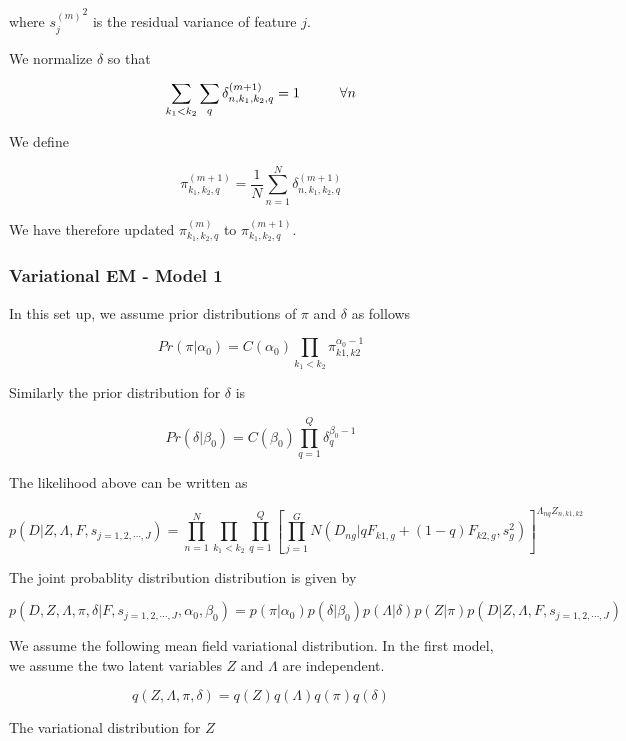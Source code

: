 \documentclass[12pt]{article}
\begin{document}
where ${s_j^{(m)}}^2$ is the residual variance of feature $j$.

We normalize $\delta$ so that 

$$ \sum_{k_1 < k_2} \sum_{q} \delta^{(m+1)}_{n, k_1, k_2, q} = 1 \hspace{1 cm} \forall n $$

We define 

$$ \pi^{(m+1)}_{k_1, k_2, q} = \frac{1}{N}\sum_{n=1}^{N} \delta^{(m+1)}_{n, k_1, k_2, q} $$


We have therefore updated $\pi^{(m)}_{k_1, k_2, q}$ to $\pi^{(m+1)}_{k_1, k_2, q}$.


\subsubsection{Variational EM  - Model 1}

In this set up, we assume prior distributions of $\pi$ and $\delta$ as follows

$$ Pr (\pi | \alpha_{0}) = C (\alpha_0) \prod_{k_1 < k_2} \pi_{k1, k2}^{\alpha_0 -1} $$

Similarly the prior distribution for $\delta$ is 

$$ Pr (\delta | \beta_0) = C (\beta_0) \prod_{q=1}^{Q} \delta_{q}^{\beta_0 -1 }  $$

The likelihood above can be written as 

$$ p (D | Z, \Lambda, F, s_{j=1,2,\cdots,J}) = \prod_{n=1}^{N} \prod_{k_1 < k_2} \prod_{q=1}^{Q} [ \prod_{j=1}^{G} N (D_{ng} | qF_{k1,g} + (1-q)F_{k2,g}, s^2_{g})]^{\Lambda_{nq}Z_{n,k1,k2}} $$

The joint probablity distribution distribution is given by 

$$ p (D, Z, \Lambda, \pi, \delta | F, s_{j=1,2,\cdots,J}, \alpha_{0}, \beta_{0}) = p (\pi | \alpha_0) p (\delta | \beta_0)  p (\Lambda | \delta) p (Z | \pi) p (D | Z, \Lambda, F, s_{j=1,2,\cdots,J})  $$


We assume the following mean field variational distribution. In the first model, we assume the two latent variables $Z$ and $\Lambda$ are independent. 

$$ q(Z, \Lambda, \pi, \delta) = q(Z) q(\Lambda) q(\pi) q(\delta) $$

The variational distribution for $Z$
\end{document}
